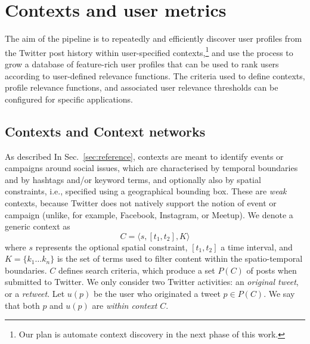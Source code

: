 \documentclass[runningheads]{llncs}
\begin{document}

\section{Contexts and user metrics}



The aim of the pipeline is to repeatedly and efficiently discover user profiles from the Twitter post history within user-specified contexts,\footnote{Our plan is automate context discovery in the next phase of this work.} and use the process to grow a database of feature-rich user profiles that can be used to rank users according to user-defined relevance functions. 
The criteria used to define contexts, profile relevance functions, and associated user relevance thresholds can be configured for specific applications.

\subsection{Contexts and Context networks} \label{sec:contexts}

As described In Sec.~\ref{sec:reference}, contexts are meant to identify events or campaigns around social issues, which are characterised by temporal boundaries and by hashtags and/or keyword terms, and optionally also by spatial constraints, i.e., specified using a geographical bounding box.
These are \textit{weak} contexts, because Twitter does not natively support the notion of event or campaign (unlike, for example, Facebook, Instagram, or Meetup).
We denote a generic context as
\begin{equation}
C = \langle s, [t_1, t_2], K \rangle 
\label{eq:context}
\end{equation}
where $s$ represents the optional spatial constraint, $[t_1, t_2]$ a time interval, and $K = \{ k_1 \dots k_n\}$ is the set of terms used to filter content within the spatio-temporal boundaries.
%
$C$ defines search criteria, which produce a set $P(C)$ of posts when submitted to Twitter.
We only consider two Twitter activities: an \textit{original tweet}, or a \textit{retweet}.
Let $u(p)$ be the user who originated a tweet $p \in P(C)$.
We say that both $p$ and $u(p)$ are \textit{within context} $C$.
\end{document}
